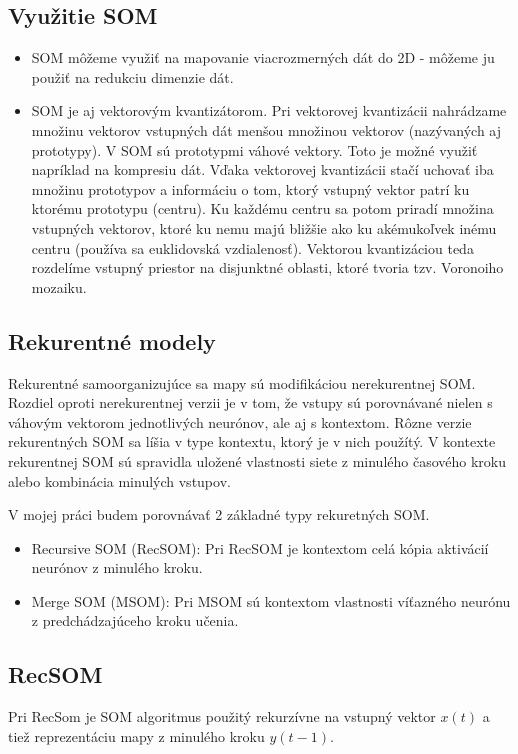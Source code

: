 \subsection{Využitie SOM}
\begin{itemize}
\item SOM môžeme využiť na mapovanie viacrozmerných dát do 2D - môžeme ju použiť na redukciu dimenzie dát.
\item SOM je aj vektorovým kvantizátorom. Pri vektorovej kvantizácii nahrádzame množinu vektorov vstupných dát menšou množinou vektorov (nazývaných aj prototypy). V SOM sú prototypmi
		váhové vektory. Toto je možné využiť napríklad na kompresiu dát. Vďaka vektorovej kvantizácii stačí uchovať iba množinu prototypov a informáciu o tom, ktorý vstupný vektor patrí 
		ku ktorému prototypu (centru). Ku každému centru sa potom priradí množina vstupných vektorov, ktoré ku nemu majú bližšie ako ku akémukoľvek inému centru (používa sa euklidovská vzdialenosť).
		Vektorou kvantizáciou teda rozdelíme vstupný priestor na disjunktné oblasti, ktoré tvoria tzv. Voronoiho mozaiku.
\end{itemize}


\subsection{Rekurentné modely}
Rekurentné samoorganizujúce sa mapy sú modifikáciou nerekurentnej SOM.
Rozdiel oproti nerekurentnej verzii je v tom, že vstupy sú porovnávané
nielen s váhovým vektorom jednotlivých neurónov, ale aj s kontextom.
Rôzne verzie rekurentných SOM sa líšia v type kontextu, ktorý je v nich použítý. 
V kontexte rekurentnej SOM sú spravidla uložené vlastnosti siete z minulého časového kroku alebo kombinácia minulých vstupov.

V mojej práci budem porovnávať 2 základné typy rekuretných SOM.

\begin{itemize}
	\item Recursive SOM (RecSOM):
	Pri RecSOM je kontextom celá kópia aktivácií neurónov z minulého kroku.
	\item Merge SOM (MSOM):
	Pri MSOM sú kontextom vlastnosti víťazného neurónu \\
	z predchádzajúceho kroku učenia.
\end{itemize}

\subsection{RecSOM}
Pri RecSom je SOM algoritmus použitý rekurzívne na vstupný vektor $x(t)$ a tiež reprezentáciu mapy
z minulého kroku $y(t-1)$. \cite{Voegtlin:2002:RSM:776097.776102}

